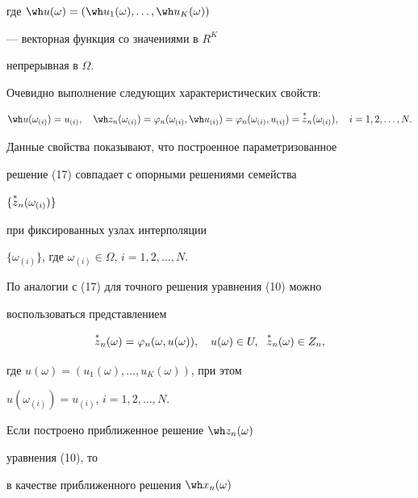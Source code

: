 где $\wh u(\omega)=(\wh u_1(\omega),\dotsc,\wh u_K(\omega))$


--- векторная функция со значениями в $R^K$


непрерывная в $\Omega$.





Очевидно выполнение следующих характеристических свойств:


$$


\wh u(\omega_{(i)})=u_{(i)},\quad


\wh z_n(\omega_{(i)})=\varphi_n(\omega_{(i)},\wh u_{(i)})=


\varphi_n(\omega_{(i)},u_{(i)})=\up{*}{z}_n(\omega_{(i)}),\quad


i=1,2,\dotsc,N.


$$








Данные свойства показывают, что построенное параметризованное


решение (17) совпадает с опорными решениями семейства


$\{\overset{*}{z}{}_n(\omega_{(i)})\}$


при фиксированных узлах интерполяции


$\{\omega_{(i)}\}$, где $\omega_{(i)}\in\Omega$, $i=1,2,\dotsc,N$.





По аналогии с (17) для точного решения уравнения (10) можно


воспользоваться представлением


\begin{equation}


\up{*}{z}_n(\omega)=\varphi_n(\omega,u(\omega)),\quad


u(\omega)\in U,\ \;\up{*}{z}_n(\omega)\in Z_n,


\end{equation}


где $u(\omega)=(u_1(\omega),\dotsc,u_K(\omega))$, при этом


$u(\omega_{(i)})=u_{(i)}$, $i=1,2,\dotsc,N$.





Если построено приближенное решение $\wh z_n(\omega)$


уравнения (10), то


в качестве приближенного решения $\wh x_n(\omega)$


